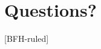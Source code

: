 \documentclass[
    ngerman,%
    authorontitle=true,
]{bfhbeamer}
\begin{document}


    \section{Questions?}
    [BFH-ruled]
    \frame{\sectionpage}








\end{document}
